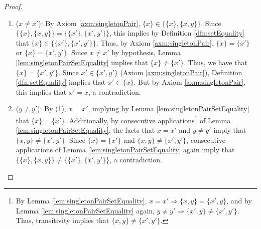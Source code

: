 \documentclass[../main.tex]{subfiles}
\begin{document}
\begin{enumerate}[ref={\thesection.\arabic*}]
\begin{proof}
        \begin{enumerate}[label={(\arabic*)}]
            \item ($x\neq x'$): By Axiom \ref{axm:singletonPair}, $\{x\}\in\{\{x\},\{x,y\}\}$. Since $\{\{x\},\{x,y\}\}=\{\{x'\},\{x',y'\}\}$, this implies by Definition \ref{dfn:setEquality} that $\{x\}\in\{\{x'\},\{x',y'\}\}$. Thus, by Axiom \ref{axm:singletonPair}, $\{x\}=\{x'\}$ or $\{x\}=\{x',y'\}$. Since $x\neq x'$ by hypothesis, Lemma \ref{lem:singletonPairSetEquality} implies that $\{x\}\neq\{x'\}$. Thus, we have that $\{x\}=\{x',y'\}$. Since $x'\in\{x',y'\}$ (Axiom \ref{axm:singletonPair}), Definition \ref{dfn:setEquality} implies that $x'\in\{x\}$. But by Axiom \ref{axm:singletonPair}, this implies that $x'=x$, a contradiction.
            \item ($y\neq y'$): By (1), $x=x'$, implying by Lemma \ref{lem:singletonPairSetEquality} that $\{x\}=\{x'\}$. Additionally, by consecutive applications\footnote{By Lemma \ref{lem:singletonPairSetEquality}, $x=x' \Longrightarrow \{x,y\}=\{x',y\}$, and by Lemma \ref{lem:singletonPairSetEquality} again, $y\neq y' \Longrightarrow \{x',y\}\neq\{x',y'\}$. Thus, transitivity implies that $\{x,y\}\neq\{x',y'\}$.} of Lemma \ref{lem:singletonPairSetEquality}, the facts that $x=x'$ and $y\neq y'$ imply that $\{x,y\}\neq\{x',y'\}$. Since $\{x\}=\{x'\}$ and $\{x,y\}\neq\{x',y'\}$, consecutive applications of Lemma \ref{lem:singletonPairSetEquality} again imply that $\{\{x\},\{x,y\}\}\neq\{\{x'\},\{x',y'\}\}$, a contradiction.

\end{enumerate}
\end{proof}
\end{enumerate}
\end{document}
